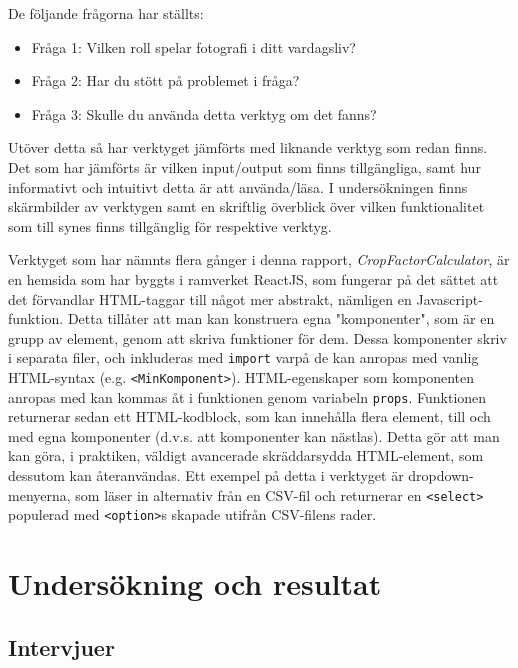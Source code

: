 \documentclass[11pt]{article}
\begin{document}
De följande frågorna har ställts: 
\fussy

\begin{itemize}
    \item Fråga 1: Vilken roll spelar fotografi i ditt vardagsliv?
    \item Fråga 2: Har du stött på problemet i fråga?
    \item Fråga 3: Skulle du använda detta verktyg om det fanns?
\end{itemize}

\bigskip

Utöver detta så har verktyget jämförts med liknande verktyg som redan finns. Det
som har jämförts är vilken input/output som finns tillgängliga, samt hur
informativt och intuitivt detta är att använda/läsa. I undersökningen finns
skärmbilder av verktygen samt en skriftlig överblick över vilken funktionalitet
som till synes finns tillgänglig för respektive verktyg.\par

\sloppy
Verktyget som har nämnts flera gånger i denna rapport,
\emph{CropFactorCalculator}, är en hemsida som har byggts i ramverket ReactJS,
som fungerar på det sättet att det förvandlar HTML-taggar till något mer
abstrakt, nämligen en Javascript-funktion. Detta tillåter att man kan konstruera
egna "komponenter", som är en grupp av element, genom att skriva funktioner för
dem. Dessa komponenter skriv i separata filer, och inkluderas med
\texttt{import} varpå de kan anropas med vanlig HTML-syntax
(e.g. \texttt{<MinKomponent>}). HTML-egenskaper som komponenten anropas med kan
kommas åt i funktionen genom variabeln \texttt{props}. Funktionen returnerar
sedan ett HTML-kodblock, som kan innehålla flera element, till och med egna
komponenter (d.v.s. att komponenter kan nästlas). Detta gör att man kan göra, i
praktiken, väldigt avancerade skräddarsydda HTML-element, som dessutom kan
återanvändas. Ett exempel på detta i verktyget är dropdown-menyerna, som läser
in alternativ från en CSV-fil och returnerar en \texttt{<select>} populerad med
\texttt{<option>}s skapade utifrån CSV-filens rader.
\fussy

\clearpage

\section{Undersökning och resultat}
\subsection{Intervjuer}
\end{document}

